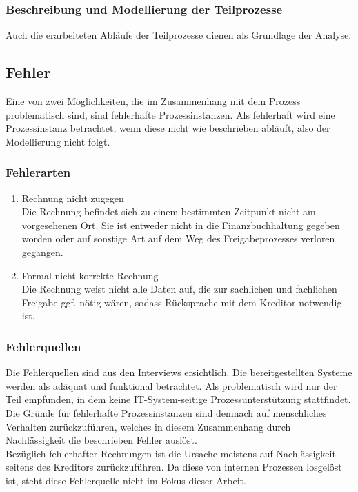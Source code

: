 \subsubsection{Beschreibung und Modellierung der Teilprozesse}

Auch die erarbeiteten Abläufe der Teilprozesse dienen als Grundlage der Analyse.


\subsection{Fehler}
Eine von zwei Möglichkeiten, die im Zusammenhang mit dem Prozess problematisch sind, sind fehlerhafte Prozessinstanzen. Als fehlerhaft wird eine Prozessinstanz betrachtet, wenn diese nicht wie beschrieben abläuft, also der Modellierung nicht folgt.
\subsubsection{Fehlerarten}

\begin{enumerate}
\item{Rechnung nicht zugegen}
\\ Die Rechnung befindet sich zu einem bestimmten Zeitpunkt nicht am vorgesehenen Ort. 
Sie ist entweder nicht in die Finanzbuchhaltung gegeben worden oder auf sonstige Art auf dem Weg des Freigabeprozesses verloren gegangen.
\item{Formal nicht korrekte Rechnung}
\\ Die Rechnung weist nicht alle Daten auf, die zur sachlichen und fachlichen Freigabe ggf. nötig wären, sodass Rücksprache mit dem Kreditor notwendig ist.
\end{enumerate}


\subsubsection{Fehlerquellen}

Die Fehlerquellen sind aus den Interviews ersichtlich. 
Die bereitgestellten Systeme werden als adäquat und funktional betrachtet.
Als problematisch wird nur der Teil empfunden, in dem keine IT-System-seitige Prozessunterstützung stattfindet.
Die Gründe für fehlerhafte Prozessinstanzen sind demnach auf menschliches Verhalten zurückzuführen, welches in diesem Zusammenhang durch Nachlässigkeit die beschrieben Fehler auslöst.
\\
Bezüglich fehlerhafter Rechnungen ist die Ursache meistens auf Nachlässigkeit seitens des Kreditors zurückzuführen.
Da diese von internen Prozessen losgelöst ist, steht diese Fehlerquelle nicht im Fokus dieser Arbeit. 

